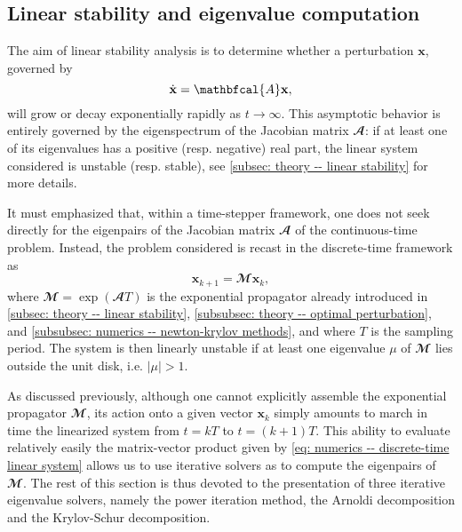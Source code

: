 
  \subsection{Linear stability and eigenvalue computation}

  The aim of linear stability analysis is to determine whether a perturbation $\textbf{x}$, governed by
  \begin{equation}
    \dot{ \mathbf{x} } = \mathbfcal{A} \mathbf{x},
    \notag
  \end{equation}
  will grow or decay exponentially rapidly as $t \to \infty$. This asymptotic behavior is entirely governed by the eigenspectrum of the Jacobian matrix $\mathbfcal{A}$: if at least one of its eigenvalues has a positive (resp. negative) real part, the linear system considered is unstable (resp. stable), see \textsection \ref{subsec: theory -- linear stability} for more details.

  It must emphasized that, within a time-stepper framework, one does not seek directly for the eigenpairs of the Jacobian matrix $\mathbfcal{A}$ of the continuous-time problem. Instead, the problem considered is recast in the discrete-time framework as
  \begin{equation}
    \mathbf{x}_{k+1} = \mathbfcal{M} \mathbf{x}_k,
    \label{eq: numerics -- discrete-time linear system}
  \end{equation}
  where $\mathbfcal{M} = \exp \left( \mathbfcal{A} T \right)$ is the exponential propagator already introduced in \textsection \ref{subsec: theory -- linear stability}, \textsection \ref{subsubsec: theory -- optimal perturbation}, and \textsection \ref{subsubsec: numerics -- newton-krylov methods}, and where $T$ is the sampling period. The system is then linearly unstable if at least one eigenvalue $\mu$ of $\mathbfcal{M}$ lies outside the unit disk, i.e. $\vert \mu \vert > 1$.

  As discussed previously, although one cannot explicitly assemble the exponential propagator $\mathbfcal{M}$, its action onto a given vector $\mathbf{x}_k$ simply amounts to march in time the linearized system from $t = kT$ to $t = (k+1)T$. This ability to evaluate relatively easily the matrix-vector product given by \eqref{eq: numerics -- discrete-time linear system} allows us to use iterative solvers as to compute the eigenpairs of $\mathbfcal{M}$. The rest of this section is thus devoted to the presentation of three iterative eigenvalue solvers, namely the power iteration method, the Arnoldi decomposition and the Krylov-Schur decomposition.
